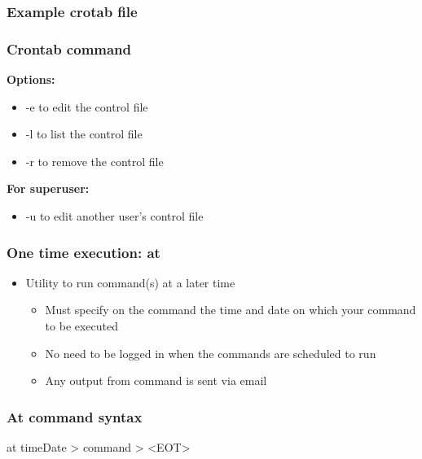\documentclass{report}
\begin{document}
    \subsubsection{Example crotab file}
    \bigbreak \noindent 

    \bigbreak \noindent 
    \subsubsection{Crontab command}
    \bigbreak \noindent 
    \textbf{Options:}
    \begin{itemize}
        \item -e to edit the control file
        \item -l to list the control file
        \item -r to remove the control file
    \end{itemize}
    \bigbreak \noindent 
    \textbf{For superuser:}
    \begin{itemize}
        \item -u to edit another user's control file 
    \end{itemize}

    \bigbreak \noindent 
    \subsubsection{One time execution: at}
    \begin{itemize}
        \item Utility to run command(s) at a later time
            \begin{itemize}
                \item Must specify on the command the time and date on which your command to be executed
                \item No need to be logged in when the commands are scheduled to run
                \item Any output from command is sent via email
            \end{itemize}
    \end{itemize}
    \bigbreak \noindent 
    \subsubsection{At command syntax}
    \bigbreak \noindent 
    \begin{bashcode}
    at timeDate
        > command
        > <EOT>
    \end{bashcode}
\end{document}
